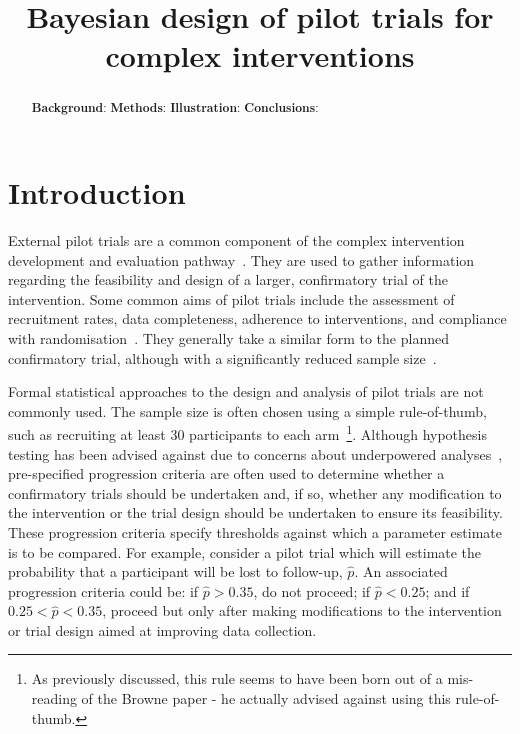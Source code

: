 \documentclass{article} %
\title{Bayesian design of pilot trials for complex interventions}
\begin{document}
\maketitle

\begin{abstract}
\textbf{Background}: 
\textbf{Methods}: 
\textbf{Illustration}: 
\textbf{Conclusions}: 
\end{abstract}

\section{Introduction}\label{sec:introduction}

External pilot trials are a common component of the complex intervention development and evaluation pathway~\cite{Craig2008}. They are used to gather information regarding the feasibility and design of a larger, confirmatory trial of the intervention. Some common aims of pilot trials include the assessment of recruitment rates, data completeness, adherence to interventions, and compliance with randomisation~\cite{Avery2017}. They generally take a similar form to the planned confirmatory trial, although with a significantly reduced sample size~\cite{Eldridge2016}.

Formal statistical approaches to the design and analysis of pilot trials are not commonly used. The sample size is often chosen using a simple rule-of-thumb, such as recruiting at least 30 participants to each arm~\cite{Lancaster2004, Browne1995}\footnote{As previously discussed, this rule seems to have been born out of a mis-reading of the Browne paper - he actually advised against using this rule-of-thumb.}. Although hypothesis testing has been advised against due to concerns about underpowered analyses~\cite{Lancaster2004, Arain2010}, pre-specified progression criteria are often used to determine whether a confirmatory trials should be undertaken and, if so, whether any modification to the intervention or the trial design should be undertaken to ensure its feasibility. These progression criteria specify thresholds against which a parameter estimate is to be compared. For example, consider a pilot trial which will estimate the probability that a participant will be lost to follow-up, $\hat{p}$. An associated progression criteria could be: if $\hat{p} > 0.35$, do not proceed; if $\hat{p} < 0.25$; and if $0.25 < \hat{p} < 0.35$, proceed but only after making modifications to the intervention or trial design aimed at improving data collection. 
\end{document}
